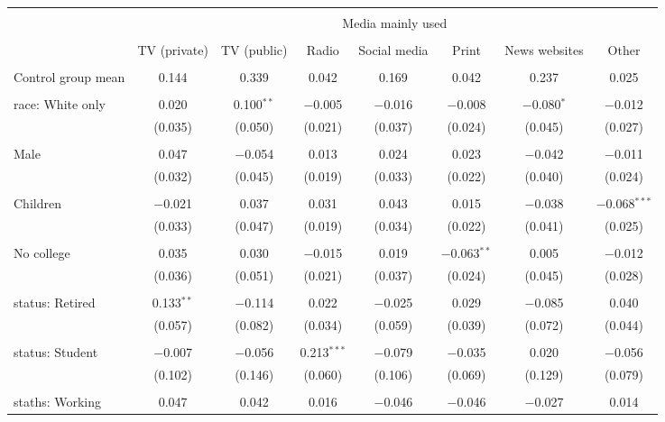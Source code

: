 
\begin{tabular}{@{\extracolsep{5pt}}lccccccc} 
\\[-1.8ex]\hline 
\hline \\[-1.8ex] 
 & \multicolumn{7}{c}{Media mainly used} \\ 
\cline{2-8} 
\\[-1.8ex] & TV (private) & TV (public) & Radio & Social media & Print & News websites & Other \\ 
\hline \\[-1.8ex] 
 Control group mean & 0.144 & 0.339 & 0.042 & 0.169 & 0.042 & 0.237 & 0.025  \\ \hline \\[-1.8ex] race: White only & 0.020 & 0.100$^{**}$ & $-$0.005 & $-$0.016 & $-$0.008 & $-$0.080$^{*}$ & $-$0.012 \\ 
  & (0.035) & (0.050) & (0.021) & (0.037) & (0.024) & (0.045) & (0.027) \\ 
  & & & & & & & \\ 
 Male & 0.047 & $-$0.054 & 0.013 & 0.024 & 0.023 & $-$0.042 & $-$0.011 \\ 
  & (0.032) & (0.045) & (0.019) & (0.033) & (0.022) & (0.040) & (0.024) \\ 
  & & & & & & & \\ 
 Children & $-$0.021 & 0.037 & 0.031 & 0.043 & 0.015 & $-$0.038 & $-$0.068$^{***}$ \\ 
  & (0.033) & (0.047) & (0.019) & (0.034) & (0.022) & (0.041) & (0.025) \\ 
  & & & & & & & \\ 
 No college & 0.035 & 0.030 & $-$0.015 & 0.019 & $-$0.063$^{**}$ & 0.005 & $-$0.012 \\ 
  & (0.036) & (0.051) & (0.021) & (0.037) & (0.024) & (0.045) & (0.028) \\ 
  & & & & & & & \\ 
 status: Retired & 0.133$^{**}$ & $-$0.114 & 0.022 & $-$0.025 & 0.029 & $-$0.085 & 0.040 \\ 
  & (0.057) & (0.082) & (0.034) & (0.059) & (0.039) & (0.072) & (0.044) \\ 
  & & & & & & & \\ 
 status: Student & $-$0.007 & $-$0.056 & 0.213$^{***}$ & $-$0.079 & $-$0.035 & 0.020 & $-$0.056 \\ 
  & (0.102) & (0.146) & (0.060) & (0.106) & (0.069) & (0.129) & (0.079) \\ 
  & & & & & & & \\ 
 staths: Working & 0.047 & 0.042 & 0.016 & $-$0.046 & $-$0.046 & $-$0.027 & 0.014 \\ 

\end{tabular}
